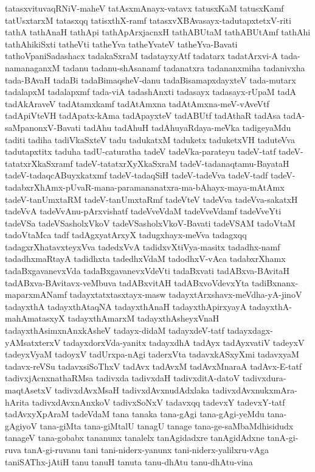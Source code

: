 {tatasxvituvaqRNiV-maheV
tatAsxmAnayx-vatavx
tatusxKaM
tatusxKamf
tatUsxtarxM
tatasxqq
tatisxthX-ramf
tatasxvXBAvasayx-tadutapxtetxV-riti
tathA
tathAnaH
tathApi
tathApArxjacnxH
tathABUtaM
tathABUtAmf
tathAhi
tathAhikiSxti
tatheVti
tatheYva
tatheYvateV
tatheYva-Bavati
tathoVpaniSadashacx
tadakaSxraM
tadatayxyAtf
tadatarx
tadatArxvi-A
tada-namanaganxM
tadanu
tadanu-shAsanamf
tadanatxra
tadananxmiha
tadanivxha
tada-BAvaH
tadaBi
tadaBimaqsheV-danu
tadaBisamapxdayxteV
tada-mutarx
tadalapxM
tadalapxmf
tada-viA
tadashAnxti
tadasayx
tadasayx-rUpaM
tadA
tadAkAraveV
tadAtamxkamf
tadAtAmxna
tadAtAmxna-meV-vAveVtf
tadApiVteVH
tadApatx-kAma
tadApayxteV
tadABUtf
tadAthaR
tadAsa
tadA-saMpanonxV-Bavati
tadAhu
tadAhuH
tadAhuyaRdaya-meVka
tadigeyaMdu
taditi
tadiha
tadiVkaSxteV
tadu
tadukatxM
taduketx
taduketxVH
taduteVva
tadutapxtitx
taduha
tadU-caturatha
tadeV
tadeVka-parateyu
tadeV-tatf
tadeV-tatatxrXkaSxramf
tadeV-tatatxrXyXkaSxraM
tadeV-tadanaqtamu-BayataH
tadeV-tadaqcABuyxkatxmf
tadeV-tadaqSiH
tadeV-tadeVva
tadeV-tadf
tadeV-tadabxrXhAmx-pUvaR-mana-paramananatxra-ma-bAhayx-maya-mAtAmx
tadeV-tanUmxtaRM
tadeV-tanUmxtaRmf
tadeVteV
tadeVva
tadeVva-sakatxH
tadeVvA
tadeVvAnu-pArxvishatf
tadeVveVdaM
tadeVveVdamf
tadeVveYti
tadeVSa
tadeVSasholxVkoV
tadeVSasholxVkoV-Bavati
tadeVSAM
tadoVtaM
tadoVtaMca
tadf
tadAgxyatArxyX
tadugxhayx-meVva
tadagxqq
tadagxrXhatavxteyxVva
tadedxVvA
tadidxvXtiVya-masitx
tadadhx-namf
tadadhxmaRtayA
tadidhxta
tadedhxVdaM
tadodhxV-vAca
tadabxrXhamx
tadaBxgavanevxVda
tadaBxgavanevxVdeVti
tadaBxvati
tadABxva-BAvitaH
tadABxva-BAvitavx-veMbuva
tadABxvitAH
tadABxvoVdevxYta
tadiBxnanx-maparxmANamf
tadayxtatxtasxtayx-masw
tadayxtArxshavx-meVdha-yA-jinoV
tadayxthA
tadayxthAtaqNA
tadayxthAnaH
tadayxthApirxyayA
tadayxthA-mahAmatasxyX
tadayxthAmarxM
tadayxthAsheyxVnaH
tadayxthAsimxnAnxkAsheV
tadayx-didaM
tadayxdeV-tatf
tadayxdagx-yAMsatxterxV
tadayxdorxVda-yanitx
tadayxdhA
tadAyx
tadAyxvatiV
tadeyxV
tadeyxVyaM
tadoyxV
tadUrxpa-nAgi
taderxVta
tadavxkASxyXmi
tadavxyaM
tadavx-reVSu
tadavxsiSoThxV
tadAvx
tadAvxM
tadAvxMnaraA
tadAvx-E-tatf
tadivxjAcnxnathaRMsa
tadivxda
tadivxdaH
tadivxditA-datoV
tadivxdura-maqtAsetxV
tadivxdAvxMsaH
tadivxdAvxnudAdxlaka
tadivxdAvxnukxmAra-hArita
tadivxdAvxnAnxkoV
tadivxSoNxV
tadavxqq
tadevxY
tadevxY-tatf
tadAvxyXpAraM
tadeVdaM
tana
tanaka
tana-gAgi
tana-gAgi-yeMdu
tana-gAgiyoV
tana-giMta
tana-giMtalU
tanagU
tanage
tana-ge-saMbaMdhisidudx
tanageV
tana-gobabx
tananunx
tanalelx
tanAgidadxre
tanAgidAdxne
tanA-gi-ruva
tanA-gi-ruvanu
tani
tani-niderx-yanunx
tani-niderx-yalilxru-vAga
taniSAThx-jAtiH
tanu
tanuH
tanuta
tanu-dhAtu
tanu-dhAtu-vina
}
